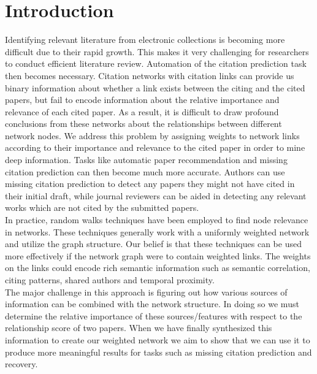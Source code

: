 \documentclass{article} %
\begin{document}
\section{Introduction}
Identifying relevant literature from electronic collections is becoming more difficult due to their rapid growth. This makes it very challenging for researchers to conduct efficient literature review. Automation of the citation prediction task then becomes necessary. Citation networks with citation links can provide us binary information about whether a link exists between the citing and the cited papers, but fail to encode information about the relative importance and relevance of each cited paper. As a result, it is difficult to draw profound conclusions from these networks about the relationships between different network nodes. We address this problem by assigning weights to network links according to their importance and relevance to the cited paper in order to mine deep information. Tasks like automatic paper recommendation and missing citation prediction can then become much more accurate. Authors can use missing citation prediction to detect any papers they might not have cited in their initial draft, while journal reviewers can be aided in detecting any relevant works which are not cited by the submitted papers.\\
	In practice, random walks techniques \cite{Backstrom:2011:SRW:1935826.1935914,Sarkar2009,Tong2006} have been employed to find node relevance in networks. These techniques generally work with a uniformly weighted network and utilize the graph structure. Our belief is that these techniques can be used more effectively if the network graph were to contain weighted links. The weights on the links could encode rich semantic information such as semantic correlation, citing patterns, shared authors and temporal proximity.\\
The major challenge in this approach is figuring out how various sources of information can be combined with the network structure. In doing so we must determine the relative importance of these sources/features with respect to the relationship score of two papers. When we have finally synthesized this information to create our weighted network we aim to show that we can use it to produce more meaningful results for tasks such as missing citation prediction and recovery.
\end{document}
